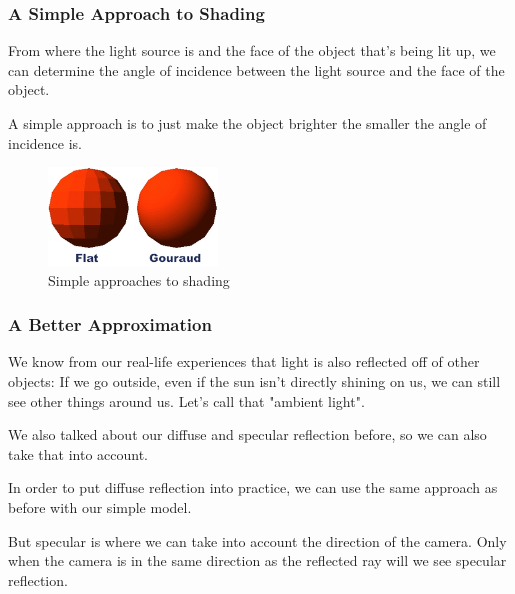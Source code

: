 \documentclass[12pt]{beamer}
\begin{document}
  \begin{frame}
    \frametitle{A Simple Approach to Shading} %

    From where the light source is and the face of the object that's being lit up, we can determine the angle of incidence between the light source and the face of the object.

    A simple approach is to just make the object brighter the smaller the angle of incidence is.




    \begin{figure}
      \centering
      \includegraphics[width=0.4\textwidth]{flatvsgouraud.png}
      \caption{Simple approaches to shading}\label{fig:shading}
    \end{figure}

  \end{frame}

  \begin{frame}
    \frametitle{A Better Approximation} %

    We know from our real-life experiences that light is also reflected off of other objects: If we go outside, even if the sun isn't directly shining on us, we can still see other things around us.
    Let's call that "ambient light".

    We also talked about our diffuse and specular reflection before, so we can also take that into account.

    In order to put diffuse reflection into practice, we can use the same approach as before with our simple model.

    But specular is where we can take into account the direction of the camera.
    Only when the camera is in the same direction as the reflected ray will we see specular reflection.

  \end{frame}
\end{document}
